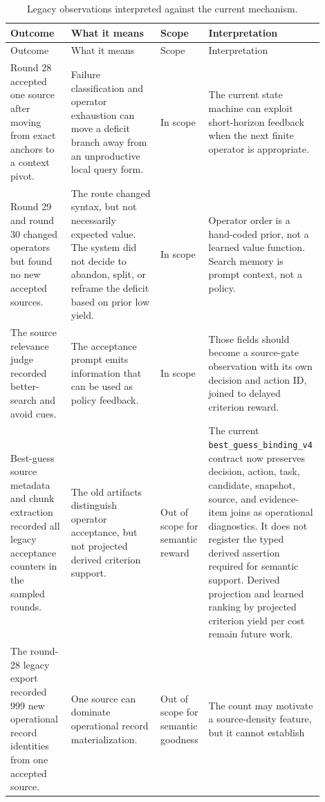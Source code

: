 \documentclass[11pt]{article}
\newcommand{\action}[1]{\texttt{#1}}
\begin{document}
\begin{longtable}{@{}p{0.19\linewidth}p{0.28\linewidth}p{0.11\linewidth}p{0.32\linewidth}@{}}
\caption{Legacy observations interpreted against the current mechanism.}
\label{tab:gap-analysis}\\
\toprule
Outcome & What it means & Scope & Interpretation \\
\midrule
\endfirsthead
\toprule
Outcome & What it means & Scope & Interpretation \\
\midrule
\endhead
\bottomrule
\endfoot
Round 28 accepted one source after moving from exact anchors to a context
pivot. &
Failure classification and operator exhaustion can move a deficit branch away
from an unproductive local query form. &
In scope &
The current state machine can exploit short-horizon feedback when the next
finite operator is appropriate. \\
\addlinespace
Round 29 and round 30 changed operators but found no new accepted sources. &
The route changed syntax, but not necessarily expected value.  The system did
not decide to abandon, split, or reframe the deficit based on prior low yield. &
In scope &
Operator order is a hand-coded prior, not a learned value function.  Search
memory is prompt context, not a policy. \\
\addlinespace
The source relevance judge recorded better-search and avoid cues. &
The acceptance prompt emits information that can be used as policy feedback. &
In scope &
Those fields should become a source-gate observation with its own decision and
action ID, joined to delayed criterion reward. \\
\addlinespace
Best-guess source metadata and chunk extraction recorded all legacy acceptance
counters in the sampled rounds. &
The old artifacts distinguish operator acceptance, but not projected derived
criterion support. &
Out of scope for semantic reward &
The current \action{best\_guess\_binding\_v4} contract now preserves decision,
action, task, candidate, snapshot, source, and evidence-item joins as
operational diagnostics.  It does not register the typed derived assertion
required for semantic support.  Derived projection and learned ranking by
projected criterion yield per cost remain future work. \\
\addlinespace
The round-28 legacy export recorded 999 new operational record identities from
one accepted source. &
One source can dominate operational record materialization. &
Out of scope for semantic goodness &
The count may motivate a source-density feature, but it cannot establish

\end{longtable}
\end{document}
